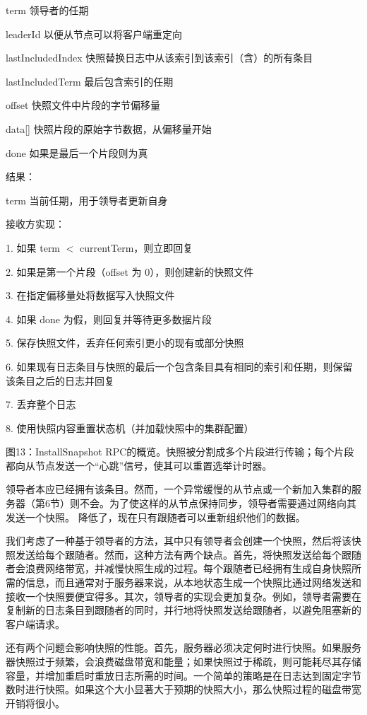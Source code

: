 \documentclass[12pt,a4paper]{report} %
\begin{document}
term 领导者的任期

leaderId 以便从节点可以将客户端重定向

lastIncludedIndex 快照替换日志中从该索引到该索引（含）的所有条目

lastIncludedTerm 最后包含索引的任期

offset 快照文件中片段的字节偏移量

data[] 快照片段的原始字节数据，从偏移量开始

done 如果是最后一个片段则为真

结果：

term 当前任期，用于领导者更新自身

接收方实现：

1. 如果 term $<$ currentTerm，则立即回复

2. 如果是第一个片段（offset 为 0），则创建新的快照文件

3. 在指定偏移量处将数据写入快照文件

4. 如果 done 为假，则回复并等待更多数据片段

5. 保存快照文件，丢弃任何索引更小的现有或部分快照

6. 如果现有日志条目与快照的最后一个包含条目具有相同的索引和任期，则保留该条目之后的日志并回复

7. 丢弃整个日志

8. 使用快照内容重置状态机（并加载快照中的集群配置）

图13：InstallSnapshot RPC的概览。快照被分割成多个片段进行传输；每个片段都向从节点发送一个“心跳”信号，使其可以重置选举计时器。

领导者本应已经拥有该条目。然而，一个异常缓慢的从节点或一个新加入集群的服务器（第6节）则不会。为了使这样的从节点保持同步，领导者需要通过网络向其发送一个快照。
降低了，现在只有跟随者可以重新组织他们的数据。

我们考虑了一种基于领导者的方法，其中只有领导者会创建一个快照，然后将该快照发送给每个跟随者。然而，这种方法有两个缺点。首先，将快照发送给每个跟随者会浪费网络带宽，并减慢快照生成的过程。每个跟随者已经拥有生成自身快照所需的信息，而且通常对于服务器来说，从本地状态生成一个快照比通过网络发送和接收一个快照要便宜得多。其次，领导者的实现会更加复杂。例如，领导者需要在复制新的日志条目到跟随者的同时，并行地将快照发送给跟随者，以避免阻塞新的客户端请求。

还有两个问题会影响快照的性能。首先，服务器必须决定何时进行快照。如果服务器快照过于频繁，会浪费磁盘带宽和能量；如果快照过于稀疏，则可能耗尽其存储容量，并增加重启时重放日志所需的时间。一个简单的策略是在日志达到固定字节数时进行快照。如果这个大小显著大于预期的快照大小，那么快照过程的磁盘带宽开销将很小。
\end{document}
